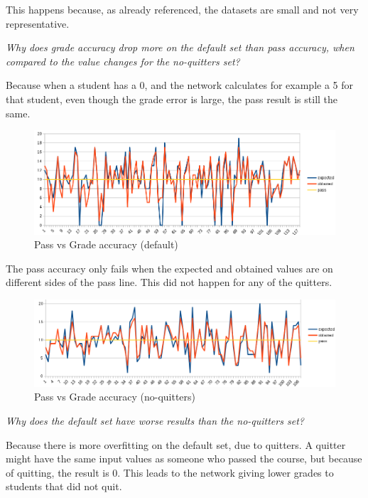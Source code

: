 \documentclass[11pt]{article}
\begin{document}
This happens because, as already referenced, the datasets are small and not very representative.

\textit{Why does grade accuracy drop more on the default set than pass accuracy, when compared to the value changes for the no-quitters set?}

Because when a student has a 0, and the network calculates for example a 5 for that student, even though the grade error is large, the pass result is still the same.

\begin{figure}[H]
\label{fig:Pass vs Grade}
\includegraphics[scale=0.6]{passgrade.png}
\centering
\caption{Pass vs Grade accuracy (default)}
\end{figure}

The pass accuracy only fails when the expected and obtained values are on different sides of the pass line. This did not happen for any of the quitters.

\begin{figure}[H]
\label{fig:Pass vs Grade}
\includegraphics[scale=0.6]{passgradenoquit.png}
\centering
\caption{Pass vs Grade accuracy (no-quitters)}
\end{figure}

\newpage
\textit{Why does the default set have worse results than the no-quitters set?}

Because there is more overfitting on the default set, due to quitters. A quitter might have the same input values as someone who passed the course, but because of quitting, the result is 0. This leads to the network giving lower grades to students that did not quit.
\end{document}
